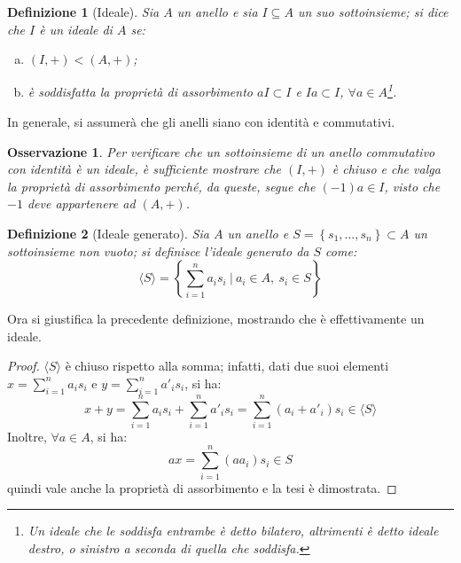 \documentclass[12pt]{scrartcl}
\theoremstyle{style}
\newtheorem{definizione}{Definizione}[section]
\newtheorem{osservazione}{Osservazione}[section]
\newenvironment{boxenv}[1][]{
    \begin{eqbox}[#1]
    }{
   \end{eqbox}
}
\numberwithin{equation}{subsection}
\begin{document}
\begin{definizione}
	[Ideale]
	Sia $A $ un anello e sia $I \subseteq A$ un suo sottoinsieme; si dice che $I$ \`e un ideale di $A$ se:
	\begin{enumerate}[(a).]
		\item $(I,+) < (A,+)$;
		\item \`e soddisfatta la propriet\`a di assorbimento $aI \subset I$ e $Ia \subset I$, $\forall a \in A$\footnote{Un ideale che le soddisfa entrambe \`e detto \textit{bilatero}, altrimenti \`e detto \textit{ideale destro}, o \textit{sinistro} a seconda di quella che soddisfa.}.
	\end{enumerate}
\end{definizione}
\begin{boxenv}[]
\centering	In generale, si assumer\`a che gli anelli siano con identit\`a e commutativi.
\end{boxenv}
\begin{osservazione}
Per verificare che un sottoinsieme di un anello commutativo con identit\`a \`e un ideale, \`e sufficiente mostrare che $(I,+)$ \`e chiuso e che valga la propriet\`a di assorbimento perch\'e, da queste, segue che $(-1)a \in I$, visto che $-1$ deve appartenere ad $(A,+)$.
\end{osservazione}
\begin{definizione}
	[Ideale generato]
	Sia $A$ un anello e $S=\left\{ s_1,\ldots,s_n \right\}  \subset A$ un sottoinsieme non vuoto; si definisce l'\textit{ideale generato} da $S$ come:
	\[
	\langle S \rangle= \left\{ \sum_{i=1}^{n} a_i s_i  \ \Bigg\lvert\ a_i \in A, \ s_i \in S \right\} 
	\] 
\end{definizione}
\noindent Ora si giustifica la precedente definizione, mostrando che \`e effettivamente un ideale.
\begin{proof}
	$\langle S \rangle$ \`e chiuso rispetto alla somma; infatti, dati due suoi elementi $x = \sum_{i=1}^{n} a_i s_i$ e $ y = \sum_{i=1}^{n} a'_i s_i$, si ha:
\[
x+y = \sum_{i=1}^{n} a_is_i + \sum_{i=1}^{n} a'_i s_i = \sum_{i=1}^{n} (a_i + a'_i) s_i \in \langle S \rangle
\] 
Inoltre, $\forall a \in A$, si ha:
\[
ax = \sum_{i=1}^{n}( a a_i) s_i \in S
\] 
quindi vale anche la propriet\`a di assorbimento e la tesi \`e dimostrata.
\end{proof}
\end{document}
